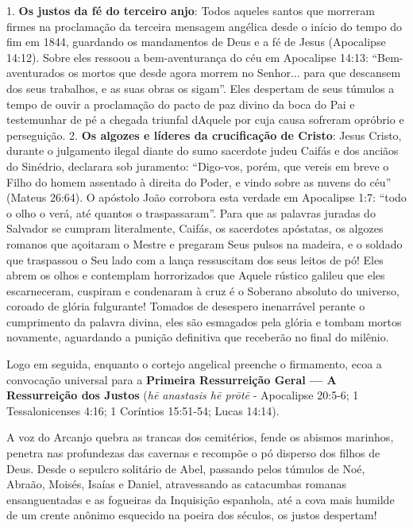1. \textbf{Os justos da fé do terceiro anjo}: Todos aqueles santos que morreram firmes na proclamação da terceira mensagem angélica desde o início do tempo do fim em 1844, guardando os mandamentos de Deus e a fé de Jesus (Apocalipse 14:12). Sobre eles ressoou a bem-aventurança do céu em Apocalipse 14:13: ``Bem-aventurados os mortos que desde agora morrem no Senhor... para que descansem dos seus trabalhos, e as suas obras os sigam''. Eles despertam de seus túmulos a tempo de ouvir a proclamação do pacto de paz divino da boca do Pai e testemunhar de pé a chegada triunfal dAquele por cuja causa sofreram opróbrio e perseguição.
2. \textbf{Os algozes e líderes da crucificação de Cristo}: Jesus Cristo, durante o julgamento ilegal diante do sumo sacerdote judeu Caifás e dos anciãos do Sinédrio, declarara sob juramento: ``Digo-vos, porém, que vereis em breve o Filho do homem assentado à direita do Poder, e vindo sobre as nuvens do céu'' (Mateus 26:64). O apóstolo João corrobora esta verdade em Apocalipse 1:7: ``todo o olho o verá, até quantos o traspassaram''. Para que as palavras juradas do Salvador se cumpram literalmente, Caifás, os sacerdotes apóstatas, os algozes romanos que açoitaram o Mestre e pregaram Seus pulsos na madeira, e o soldado que traspassou o Seu lado com a lança ressuscitam dos seus leitos de pó! Eles abrem os olhos e contemplam horrorizados que Aquele rústico galileu que eles escarneceram, cuspiram e condenaram à cruz é o Soberano absoluto do universo, coroado de glória fulgurante! Tomados de desespero inenarrável perante o cumprimento da palavra divina, eles são esmagados pela glória e tombam mortos novamente, aguardando a punição definitiva que receberão no final do milênio.

Logo em seguida, enquanto o cortejo angelical preenche o firmamento, ecoa a convocação universal para a \textbf{Primeira Ressurreição Geral — A Ressurreição dos Justos} (\textit{hē anastasis hē prōtē} - Apocalipse 20:5-6; 1 Tessalonicenses 4:16; 1 Coríntios 15:51-54; Lucas 14:14).

A voz do Arcanjo quebra as trancas dos cemitérios, fende os abismos marinhos, penetra nas profundezas das cavernas e recompõe o pó disperso dos filhos de Deus. Desde o sepulcro solitário de Abel, passando pelos túmulos de Noé, Abraão, Moisés, Isaías e Daniel, atravessando as catacumbas romanas ensanguentadas e as fogueiras da Inquisição espanhola, até a cova mais humilde de um crente anônimo esquecido na poeira dos séculos, os justos despertam!

